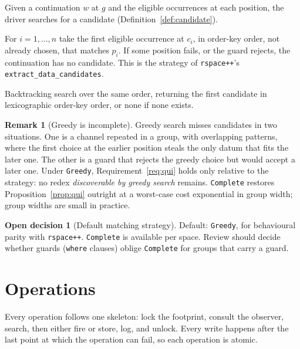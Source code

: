 \documentclass[11pt]{article}
\theoremstyle{plain}
\theoremstyle{definition}
\newtheorem{remark}[proposition]{Remark}
\newtheorem{decision}{Open decision}
\newcommand{\code}[1]{\texttt{#1}}
\begin{document}
Given a continuation $w$ at $g$ and the eligible occurrences at each position, the
driver searches for a candidate (Definition~\ref{def:candidate}).

\begin{description}[nosep,leftmargin=1.5em,style=nextline]
\item[\code{Greedy} (default).] For $i=1,\dots,n$ take the first eligible
  occurrence at $c_i$, in order-key order, not already chosen, that matches $p_i$.
  If some position fails, or the guard rejects, the continuation has no
  candidate. This is the strategy of \code{rspace++}'s
  \code{extract\_data\_candidates}.
\item[\code{Complete}.] Backtracking search over the same order, returning the
  first candidate in lexicographic order-key order, or none if none exists.
\end{description}

\begin{remark}[Greedy is incomplete]\label{rem:greedy}
Greedy search misses candidates in two situations. One is a channel repeated in a
group, with overlapping patterns, where the first choice at the earlier position
steals the only datum that fits the later one. The other is a guard that rejects the
greedy choice but would accept a later one. Under \code{Greedy},
Requirement~\ref{req:qui} holds only relative to the strategy: no redex
\emph{discoverable by greedy search} remains. \code{Complete} restores
Proposition~\ref{prop:qui} outright at a worst-case cost exponential in group
width; group widths are small in practice.
\end{remark}

\begin{decision}[Default matching strategy]
Default: \code{Greedy}, for behavioural parity with \code{rspace++}.
\code{Complete} is available per space. Review should decide whether guards
(\code{where} clauses) oblige \code{Complete} for groups that carry a guard.
\end{decision}
\section{Operations}\label{sec:ops}

Every operation follows one skeleton: lock the footprint, consult the observer, search,
then either fire or store, log, and unlock. Every write happens after the last point
at which the operation can fail, so each operation is atomic.
\end{document}
